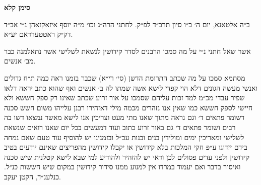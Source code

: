 \documentclass[12pt, openany]{book}
\newcommand{\chapname}{}
\newcommand{\newchap}[1]{
	\addcontentsline{toc}{chapter}{#1}
	\renewcommand{\chapname}{#1}
		\begin{center}
			\textbf{%
\fontsize{16pt}{16pt}\selectfont
				#1}
		\end{center}
}
\begin{document}
\newchap{סימן קלא}
\begin{multicols}{2}
ב״ה אלטאנא, יום ה׳ כ״ו סיון תרכ״ד לפ״ק. לחתני הרה״ג וכו׳ מ״ה יוסף איזאקזאהן נ״י אב״ד דק״ק ראטטערדאם יע״א.\\\vspace{0pt}

אשר שאל חתני נ״י על מה סמכו הרבנים לסדר קידושין לנשאת לשלישי אשר נתאלמנה כבר מב׳ אנשים.\\\vspace{0pt}

מסתמא סמכו על מה שכתב התרומת הדשן (סי׳ רי״א) שכבר בזמנו ראה כמה ת״ח גדולים ואנשי מעשה הגונים דלא הוי קפדי לישא אשה שמתו לה ב׳ אנשים ואף שהוא כתב יראה דלאו שפיר עבדי מכ״מ למד זכות עליהם שסמכו על אור זרוע שכתב שאינו רק ספק חששא ולא חיישי לספק חששא כמו שאין אנו נזהרים מכמה מילי דאזהירו רבנן עלייהו משום חשש סכנה דשומר פתאים ד׳ וגם נראה מתוך שאנו מתי מעט וצריכין אנו לישא מאשר נמצאו דשו בה רבים ושומר פתאים ד׳ גם באור זרוע כתוב ועוד דמעשים בכל יום שאנו רואים שנשאת לשלישי ומאריכין ימים ומולידין בנים ובנות עכ״ל ובזמנינו יש להוסיף עוד טעם שאם נמחה בידם יזדוגו ע״פ חקי המלכות בלא קידושין או יקבלו קידושין מהפריצים שאינם יודעים בטיב קידושין ולפני עדים פסולים לכן ודאי יש להזהיר ולהודיע למי שבא לישא קטלנית שיש סכנה ואיסור בדבר ואם יעמוד במרדו אין למנוע ממנו סידור קידושין במקום שיש חששות כנ״ל. כנלענ״ד, הקטן יעקב.\\\vspace{0pt}

\end{multicols}\newpage
\end{document}
